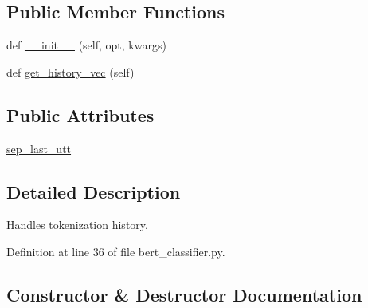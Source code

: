 \subsection*{Public Member Functions}
\begin{DoxyCompactItemize}
\item 
def \hyperlink{classparlai_1_1agents_1_1bert__classifier_1_1bert__classifier_1_1BertClassifierHistory_ae42446cb8bcb68591503e41ed7744666}{\+\_\+\+\_\+init\+\_\+\+\_\+} (self, opt, kwargs)
\item 
def \hyperlink{classparlai_1_1agents_1_1bert__classifier_1_1bert__classifier_1_1BertClassifierHistory_ac5a9d856cbb3e3994e6c99dbb1578b13}{get\+\_\+history\+\_\+vec} (self)
\end{DoxyCompactItemize}
\subsection*{Public Attributes}
\begin{DoxyCompactItemize}
\item 
\hyperlink{classparlai_1_1agents_1_1bert__classifier_1_1bert__classifier_1_1BertClassifierHistory_ab53ecd52f1f23b1ea488637cc8fd8068}{sep\+\_\+last\+\_\+utt}
\end{DoxyCompactItemize}


\subsection{Detailed Description}
\begin{DoxyVerb}Handles tokenization history.\end{DoxyVerb}
 

Definition at line 36 of file bert\+\_\+classifier.\+py.



\subsection{Constructor \& Destructor Documentation}
\mbox{\label{classparlai_1_1agents_1_1bert__classifier_1_1bert__classifier_1_1BertClassifierHistory_ae42446cb8bcb68591503e41ed7744666}} 
